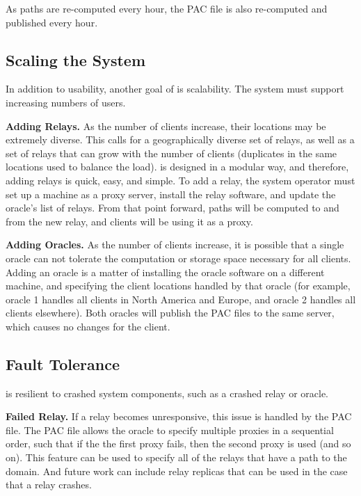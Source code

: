 

As paths are re-computed every hour, the PAC file is also re-computed and 
published every hour.

\subsection{Scaling the System}
In addition to usability, another goal of \system{} is scalability.  The system 
must support increasing numbers of users.  

{\bf Adding Relays.} As the number of clients increase, their locations may be 
extremely diverse. This calls for a geographically diverse set of relays, as 
well as a set of relays that can grow with the number of clients (duplicates in 
the same locations used to balance the load).  \system{} is 
designed in a modular way, and therefore, adding relays is quick, easy, and 
simple.  To add a relay, the system operator must set up a machine as a proxy 
server, install the \system{} relay software, and update the oracle's list of 
relays.  From that point forward, paths will be computed to and from the new 
relay, and clients will be using it as a proxy.  

{\bf Adding Oracles.} As the number of clients increase, it is possible that a 
single oracle can not tolerate the computation or storage space necessary for 
all clients.  Adding an oracle is a matter of installing the oracle software on 
a different machine, and specifying the client locations handled by that oracle 
(for example, oracle 1 handles all clients in North America and Europe, and 
oracle 2 handles all clients elsewhere).  Both oracles will publish the PAC files 
to the same server, which causes no changes for the client.

\subsection{Fault Tolerance}
\system{} is resilient to crashed system components, such as a crashed relay or 
oracle.  

{\bf Failed Relay.} If a relay becomes unresponsive, this issue is handled by 
the PAC file.  The PAC file allows the oracle to specify multiple proxies in 
a sequential order, such that if the the first proxy fails, then the second 
proxy is used (and so on).  This feature can be used to specify all of the 
relays that have a path to the domain.  And future work can include relay 
replicas that can be used in the case that a relay crashes.

